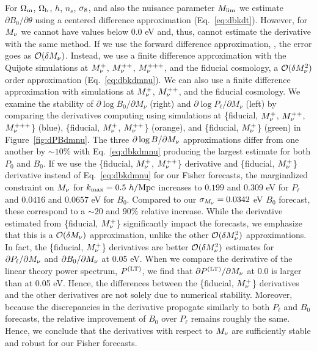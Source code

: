 For $\Omega_{\rm m}$, $\Omega_{\rm b}$, $h$, $n_s$, $\sigma_8$, and also the nuisance parameter $M_{\rm lim}$ 
we estimate $\partial B_0/\partial \theta$ using a centered difference approximation 
(Eq.~\ref{eq:dbkdt}). However, for $M_\nu$ we cannot have values below 0.0 eV 
and, thus, cannot estimate the derivative with the same method. If we use the 
forward difference approximation, 
\beq 
{} \approx {}, 
\eeq
the error goes as $\mathcal{O}(\delta M_\nu)$. Instead, we use a finite difference
approximation with the Quijote simulations at $M_\nu^{+}$, $M_\nu^{++}$, $M_\nu^{+++}$, 
and the fiducial cosmology, a $\mathcal{O}(\delta M_\nu^2)$ order approximation 
(Eq.~\ref{eq:dbkdmnu}). We can also use a finite difference approximation with 
simulations at $M_\nu^{+}$, $M_\nu^{++}$, and the fiducial cosmology. We examine
the stability of $\partial \log B_0/\partial M_\nu$ (right) and 
$\partial \log P_\ell/\partial M_\nu$ (left) by comparing the derivatives computing
using simulations at \{fiducial, $M_\nu^{+}$, $M_\nu^{++}$, $M_\nu^{+++}$\} (blue), 
\{fiducial, $M_\nu^{+}$, $M_\nu^{++}$\} (orange), and \{fiducial, $M_\nu^{+}$\} 
(green) in Figure~\ref{fig:dPBdmnu}. The three $\partial \log B/\partial M_\nu$
approximations differ from one another by $\sim10\%$ with Eq.~\ref{eq:dbkdmnu} 
producing the largest estimate for both $P_0$ and $B_0$. If we use the
\{fiducial, $M_\nu^{+}$, $M_\nu^{++}$\} derivative and \{fiducial, $M_\nu^{+}$\} derivative 
instead of Eq.~\ref{eq:dbkdmnu} for our Fisher forecasts, the marginalized constraint on
$M_\nu$ for $k_{\rm max} = 0.5~h/{\rm Mpc}$ increases to $0.199$ and $0.309$ eV for $P_\ell$ 
and $0.0416$ and $0.0657$ eV for $B_0$. Compared to our $\sigma_{M_\nu} = 0.0342$ eV 
$B_0$ forecast, these correspond to a $\sim20$ and $90\%$ relative increase. 
While the derivative estimated from \{fiducial, $M_\nu^{+}$\} significantly impact 
the forecasts, we emphasize that this is a $\mathcal{O}(\delta M_\nu)$ approximation, 
unlike the other $\mathcal{O}(\delta M_\nu^2)$ approximations. In fact, the 
\{fiducial, $M_\nu^{+}$\} derivatives are better $\mathcal{O}(\delta M_\nu^2)$ estimates
for $\partial P_\ell/\partial M_\nu$ and $\partial B_0/\partial M_\nu$ at 0.05 eV. When we 
compare the derivative of the linear theory power spectrum, $P^{(\rm LT)}$, we find 
that $\partial P^{(\rm LT)}/\partial M_\nu$ at 0.0 is larger than at 0.05 eV. Hence, 
the differences between the \{fiducial, $M_\nu^{+}$\} derivatives and the other 
derivatives are not solely due to numerical stability. Moreover, because the 
discrepancies in the derivative propogate similarly to both $P_\ell$ and $B_0$ forecasts, 
the relative improvement of $B_0$ over $P_\ell$ remains roughly the same. Hence, we conclude 
that the derivatives with respect to $M_\nu$ are sufficiently stable and robust for 
our Fisher forecasts.

